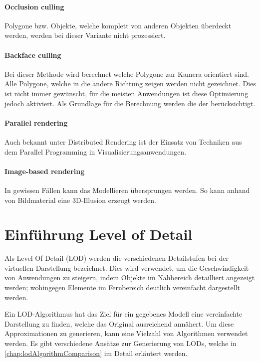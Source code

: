 \paragraph{Occlusion culling}
Polygone bzw. Objekte, welche komplett von anderen Objekten überdeckt werden, werden bei dieser Variante nicht prozessiert.

\paragraph{Backface culling}
\label{chap:backfaceCulling}
Bei dieser Methode wird berechnet welche Polygone zur Kamera orientiert sind.
Alle Polygone, welche in die andere Richtung zeigen werden nicht gezeichnet.
Dies ist nicht immer gewünscht, für die meisten Anwendungen ist diese Optimierung jedoch aktiviert.
Als Grundlage für die Berechnung werden die  der  berücksichtigt.

\paragraph{Parallel rendering}
Auch bekannt unter Distributed Rendering ist der Einsatz von Techniken aus dem Parallel Programming in Visualisierungsanwendungen.

\paragraph{Image-based rendering}
In gewissen Fällen kann das Modellieren übersprungen werden. So kann anhand von Bildmaterial eine 3D-Illusion erzeugt werden.

\section{Einführung Level of Detail}
\label{chap:lodIntroduction}
Als Level Of Detail (LOD) werden die verschiedenen Detailstufen bei der virtuellen Darstellung bezeichnet.
Dies wird verwendet, um die Geschwindigkeit von Anwendungen zu steigern, indem Objekte im Nahbereich detailliert angezeigt werden; wohingegen Elemente im Fernbereich deutlich vereinfacht dargestellt werden.

Ein LOD-Algorithmus hat das Ziel für ein gegebenes Modell eine vereinfachte Darstellung zu finden, welche das Original ausreichend annähert. Um diese Approximationen zu generieren, kann eine Vielzahl von Algorithmen verwendet werden. Es gibt verschiedene Ansätze zur Generierung von LODs, welche in \autoref{chap:lodAlgorithmComparison} im Detail erläutert werden.

